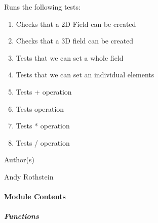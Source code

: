 \documentclass[letterpaper,10pt,english]{sphinxmanual}
\begin{document}
\sphinxAtStartPar
Runs the following tests:
\begin{enumerate}
%
\item {} 
\sphinxAtStartPar
Checks that a 2D Field can be created

\item {} 
\sphinxAtStartPar
Checks that a 3D field can be created

\item {} 
\sphinxAtStartPar
Tests that we can set a whole field

\item {} 
\sphinxAtStartPar
Tests that we can set an individual elements

\item {} 
\sphinxAtStartPar
Tests + operation

\item {} 
\sphinxAtStartPar
Tests \sphinxhyphen{} operation

\item {} 
\sphinxAtStartPar
Tests * operation

\item {} 
\sphinxAtStartPar
Tests / operation

\end{enumerate}

\sphinxAtStartPar
Author(s)

\sphinxAtStartPar
Andy Rothstein


\paragraph{Module Contents}
\label{\detokenize{autoapi/tests/test_Field/index:module-contents}}

\subparagraph{Functions}
\label{\detokenize{autoapi/tests/test_Field/index:functions}}
\end{document}
